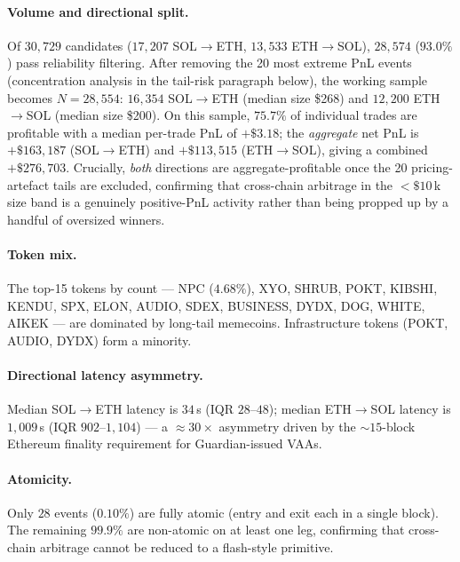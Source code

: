 \documentclass[sigconf,nonacm,10pt]{acmart}
\newcommand{\SolEth}{SOL$\to$ETH}
\newcommand{\EthSol}{ETH$\to$SOL}
\begin{document}
\paragraph{Volume and directional split.} Of $30{,}729$ candidates
($17{,}207$ \SolEth{}, $13{,}533$ \EthSol{}), $28{,}574$ ($93.0\%$)
pass reliability filtering. After removing the 20 most extreme PnL
events (concentration analysis in the tail-risk paragraph below),
the working sample becomes $N = 28{,}554$: $16{,}354$ \SolEth{}
(median size \$268) and $12{,}200$ \EthSol{} (median size \$200).
On this sample, $\mathbf{75.7\%}$ of individual trades are
profitable with a median per-trade PnL of $+\$3.18$; the
\emph{aggregate} net PnL is $+\$163{,}187$ (\SolEth) and
$+\$113{,}515$ (\EthSol), giving a combined $+\$276{,}703$.
Crucially, \emph{both} directions are aggregate-profitable once the
20 pricing-artefact tails are excluded, confirming that cross-chain
arbitrage in the $<\!\$10$\,k size band is a genuinely positive-PnL
activity rather than being propped up by a handful of oversized
winners.

\paragraph{Token mix.} The top-15 tokens by count --- NPC ($4.68\%$), XYO,
SHRUB, POKT, KIBSHI, KENDU, SPX, ELON, AUDIO, SDEX, BUSINESS, DYDX, DOG,
WHITE, AIKEK --- are dominated by long-tail memecoins. Infrastructure
tokens (POKT, AUDIO, DYDX) form a minority.

\paragraph{Directional latency asymmetry.} Median \SolEth{} latency is
$34$\,s (IQR $28$--$48$); median \EthSol{} latency is $1{,}009$\,s (IQR
$902$--$1{,}104$) --- a $\approx\!30\times$ asymmetry driven by the
$\sim\!15$-block Ethereum finality requirement for Guardian-issued VAAs.

\paragraph{Atomicity.} Only $28$ events ($0.10\%$) are fully atomic (entry
and exit each in a single block). The remaining $99.9\%$ are non-atomic on
at least one leg, confirming that cross-chain arbitrage cannot be reduced
to a flash-style primitive.
\end{document}
